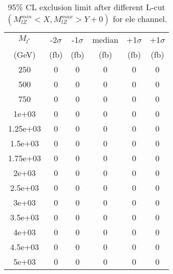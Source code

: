 \documentclass[]{article}
\begin{document}
\begin{table}
\begin{center}
\begin{tabular}{cccccc}
\hline 
\hline 
$M_{l^*}$ & -2$\sigma$ & -1$\sigma$ & median & +1$\sigma$ & +1$\sigma$\\ 
(GeV) & (fb) & (fb) & (fb) & (fb) & (fb)  \\ 
\hline 
\hline 
250 & 0 & 0 & 0 & 0 & 0\\
500 & 0 & 0 & 0 & 0 & 0\\
750 & 0 & 0 & 0 & 0 & 0\\
1e+03 & 0 & 0 & 0 & 0 & 0\\
1.25e+03 & 0 & 0 & 0 & 0 & 0\\
1.5e+03 & 0 & 0 & 0 & 0 & 0\\
1.75e+03 & 0 & 0 & 0 & 0 & 0\\
2e+03 & 0 & 0 & 0 & 0 & 0\\
2.5e+03 & 0 & 0 & 0 & 0 & 0\\
3e+03 & 0 & 0 & 0 & 0 & 0\\
3.5e+03 & 0 & 0 & 0 & 0 & 0\\
4e+03 & 0 & 0 & 0 & 0 & 0\\
4.5e+03 & 0 & 0 & 0 & 0 & 0\\
5e+03 & 0 & 0 & 0 & 0 & 0\\
\hline 
\end{tabular}
\caption{95\% CL exclusion limit after different L-cut $(M_{lZ}^{min} < X, M_{lZ}^{max} > Y + 0)$ for ele channel.}
\label{tab:limit_electron}
\end{center}
\end{table}
\end{document}

